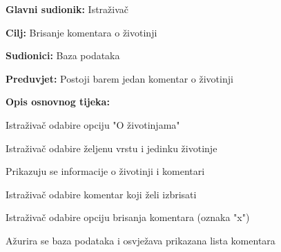 					\noindent {}
					\begin{packed_item}
	
						\item \textbf{Glavni sudionik: } Istraživač 
						\item  \textbf{Cilj:} Brisanje komentara o životinji
						\item  \textbf{Sudionici:} Baza podataka
						\item  \textbf{Preduvjet:} Postoji barem jedan komentar o životinji
						\item  \textbf{Opis osnovnog tijeka:}
						
						\item[] \begin{packed_enum}
							\item Istraživač odabire opciju "O životinjama"
							\item Istraživač odabire željenu vrstu i jedinku životinje
							\item Prikazuju se informacije o životinji i komentari
							\item Istraživač odabire komentar koji želi izbrisati
							\item Istraživač odabire opciju brisanja komentara (oznaka "x")
							\item Ažurira se baza podataka i osvježava prikazana lista komentara
							
						\end{packed_enum}
					\end{packed_item}
					\noindent {}
